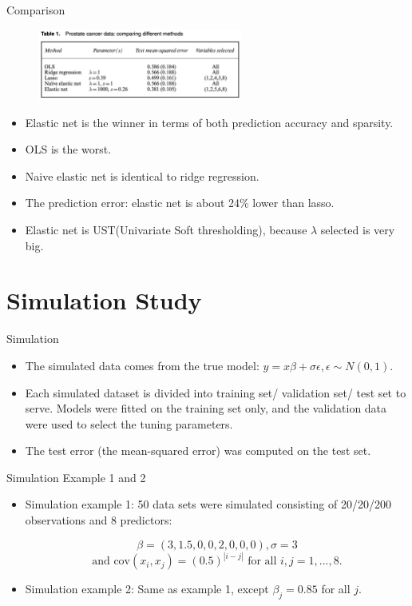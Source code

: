     \begin{frame}{Comparison}
        \begin{figure}
            \centering
            \includegraphics[width=0.6\textwidth]{img/Table 1.png}
            \label{fig:enter-label}
        \end{figure}
        \begin{itemize}
            \item Elastic net is the winner in terms of both prediction accuracy and sparsity.
            \item OLS is the worst.
            \item Naive elastic net is identical to ridge regression.
            \item The prediction error: elastic net is about 24\% lower than lasso.
            \item Elastic net is UST(Univariate Soft thresholding), because $\lambda$ selected is very big.
        \end{itemize}
    \end{frame}
\section{Simulation Study}
    
    \begin{frame}{Simulation}
    \begin{itemize}
        \item The simulated data comes from the true model: $y=x\beta+\sigma\epsilon,\epsilon\sim N(0,1).$ 
        \item Each simulated dataset is divided into training set/ validation set/ test set to serve. Models were fitted on the training set only, and the validation data were used to select the tuning parameters.
        \item The test error (the mean-squared error) was computed on the test set.

    \end{itemize}
    \end{frame}

    \begin{frame}{Simulation Example 1 and 2}
    \begin{itemize}
        \item Simulation example 1: 50 data sets were simulated consisting of 20/20/200 observations and 8 predictors:

$$
\beta=(3,1.5,0,0,2,0,0,0), \sigma=3
$$
$$
 \text{and cov}( x_i, x_j) = ( 0.5) ^{|i- j|} \text{ for all } i,j=1,...,8.
$$
        \item Simulation example 2: Same as example 1, except $\beta_j=0.85$ for all $j.$
    \end{itemize}
    \end{frame}

